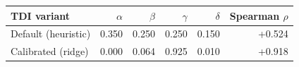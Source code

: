\begin{tabular}{lrrrrr}
\toprule
TDI variant & $\alpha$ & $\beta$ & $\gamma$ & $\delta$ & Spearman $\rho$ \\
\midrule
Default (heuristic) & 0.350 & 0.250 & 0.250 & 0.150 & +0.524 \\
Calibrated (ridge) & 0.000 & 0.064 & 0.925 & 0.010 & +0.918 \\
\bottomrule
\end{tabular}
